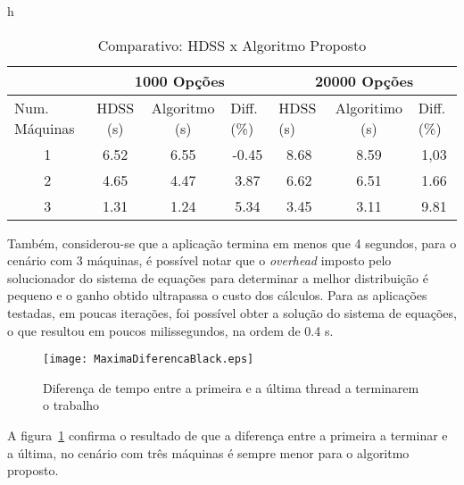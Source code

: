 \begin{table}{h}
\centering
\tiny
\caption{Comparativo: HDSS x Algoritmo Proposto}

\begin{tabular}{c|c|c|c|c|c|c|}
\cline{2-7}
\multicolumn{1}{l|}{}                 & \multicolumn{3}{c|}{1000 Opções}                              & \multicolumn{3}{c|}{20000 Opções}                                                  \\ \hline
\multicolumn{1}{|l|}{Num. Máquinas} & HDSS (s) & Algoritmo (s) & \multicolumn{1}{l|}{Diff. (\%)} & \multicolumn{1}{l|}{HDSS (s)} & Algoritimo (s) & \multicolumn{1}{l|}{Diff. (\%)} \\ \hline
\multicolumn{1}{|c|}{1 }       & 6.52     & 6.55              & -0.45                           & 8.68                          & 8.59              & 1,03                            \\ \hline
\multicolumn{1}{|c|}{2 }      & 4.65     & 4.47              & 3.87                            & 6.62                          & 6.51              & 1.66                            \\ \hline
\multicolumn{1}{|c|}{3 }      & 1.31     & 1.24              & 5.34                            & 3.45                          & 3.11              &               9.81                  \\ \hline
\end{tabular}
\label{table: black}
\end{table}

Também, considerou-se que a aplicação termina em menos que 4 segundos, para o cenário com 3 máquinas, é possível notar que o \emph{overhead} imposto pelo solucionador do sistema de equações para determinar a melhor distribuição é pequeno e o ganho obtido ultrapassa o custo dos cálculos. Para as aplicações testadas, em poucas iterações, foi possível obter a solução do sistema de equações, o que resultou em poucos milissegundos, na ordem de 0.4 s.

\begin{figure}[htb]
	\begin{center}
	\centering
			\texttt{[image: MaximaDiferencaBlack.eps]}
	\caption{Diferença de tempo entre a primeira e a última thread a terminarem o trabalho}
	\label{fig:diferencaThreadsBlack}
	\end{center}
\end{figure}

A figura~\ref{fig:diferencaThreadsBlack} confirma o resultado de que a diferença entre a primeira a terminar e a última, no cenário com três máquinas é sempre menor para o algoritmo proposto.


